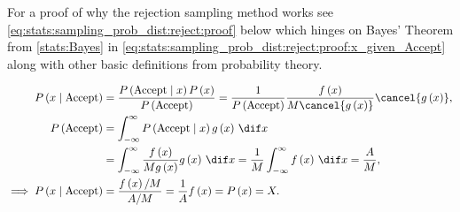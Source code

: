 For a proof of why the rejection sampling method works see \cref{eq:stats:sampling_prob_dist:reject:proof} below
which hinges on Bayes' Theorem from \cref{stats:Bayes} in \cref{eq:stats:sampling_prob_dist:reject:proof:x_given_Accept}
along with other basic definitions from probability theory.

\begin{subequations}\label{eq:stats:sampling_prob_dist:reject:proof}
\begin{align}
P\left(x \mid \text{Accept}\right) &= \frac{P\left(\text{Accept} \mid x\right) P\left(x\right)}{P\left(\text{Accept}\right)} = \frac{1}{P\left(\text{Accept}\right)} \frac{f\left(x\right)}{M \cancel{g\left(x\right)}} \cancel{g\left(x\right)}, \label{eq:stats:sampling_prob_dist:reject:proof:x_given_Accept} \\
P\left(\text{Accept}\right) &= \int_{-\infty}^{\infty} P\left(\text{Accept} \mid x\right) g\left(x\right) \, \dif x \label{eq:stats:sampling_prob_dist:reject:proof:P_Accept1} \\
&= \int_{-\infty}^{\infty} \frac{f\left(x\right)}{M g\left(x\right)} g\left(x\right) \, \dif x = \frac{1}{M} \int_{-\infty}^{\infty} f\left(x\right) \, \dif x = \frac{A}{M}, \label{eq:stats:sampling_prob_dist:reject:proof:P_Accept2} \\
\implies P\left(x \mid \text{Accept}\right) &= \frac{f\left(x\right)/M}{A/M} = \frac{1}{A} f\left(x\right) = P\left(x\right) = X. \label{eq:stats:sampling_prob_dist:reject:proof:conclusion}
\end{align}
\end{subequations}
